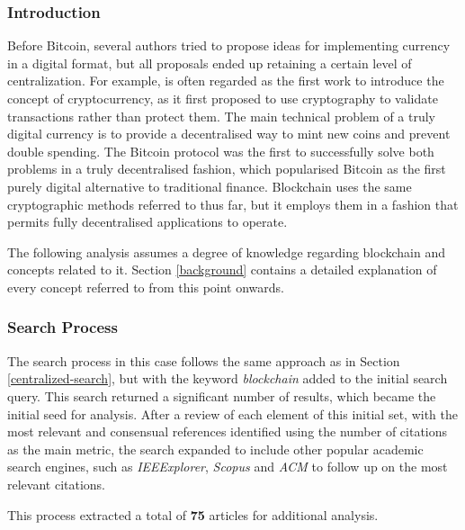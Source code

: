 \documentclass[../access.tex]{subfiles}
\begin{document}
\subsubsection{Introduction}
\label{3_slr_decentralized}
    Before Bitcoin, several authors tried to propose ideas for implementing currency in a digital format, but all proposals ended up retaining a certain level of centralization. For example, \cite{Chaum1982} is often regarded as the first work to introduce the concept of cryptocurrency, as it first proposed to use cryptography to validate transactions rather than protect them. The main technical problem of a truly digital currency is to provide a decentralised way to mint new coins and prevent double spending. The Bitcoin protocol was the first to successfully solve both problems in a truly decentralised fashion, which popularised Bitcoin as the first purely digital alternative to traditional finance. Blockchain uses the same cryptographic methods referred to thus far, but it employs them in a fashion that permits fully decentralised applications to operate.
	\par
    The following analysis assumes a degree of knowledge regarding blockchain and concepts related to it. Section \ref{background} contains a detailed explanation of every concept referred to from this point onwards.

\subsubsection{Search Process}
    The search process in this case follows the same approach as in Section \ref{centralized-search}, but with the keyword \textit{blockchain} added to the initial search query. This search returned a significant number of results, which became the initial seed for analysis. After a review of each element of this initial set, with the most relevant and consensual references identified using the number of citations as the main metric, the search expanded to include other popular academic search engines, such as \textit{IEEExplorer}, \textit{Scopus} and \textit{ACM} to follow up on the most relevant citations.
	\par
	This process extracted a total of \textbf{75} articles for additional analysis.
\end{document}
